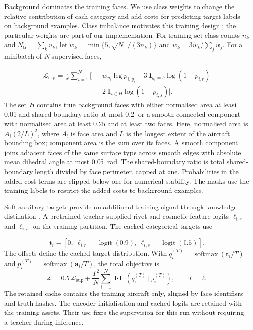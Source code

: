 \documentclass[12pt,a4paper]{article}
\begin{document}
Background dominates the training faces. We use class weights to change the relative contribution of each category and add costs for predicting target labels on background examples. Class imbalance motivates this training design \parencite{buda2018imbalance}; the particular weights are part of our implementation. For training-set class counts $n_k$ and $N_{\mathrm{tr}}=\sum_k n_k$, let $\tilde{w}_k=\min\{5,\sqrt{N_{\mathrm{tr}}/(3n_k)}\}$ and $w_k=3\tilde{w}_k/\sum_j\tilde{w}_j$. For a minibatch of $N$ supervised faces,

\begin{equation}
\begin{aligned}
\mathcal{L}_{\mathrm{sup}}=\frac{1}{N}\sum_{i=1}^{N}\big[&-w_{y_i}\log p_{i,y_i}
-3\,\mathbf{1}_{y_i=b}\log(1-p_{i,r})\\
&-2\,\mathbf{1}_{i\in H}\log(1-p_{i,s})\big].
\end{aligned}
\label{eq:categorical_supervision}
\end{equation}
The set $H$ contains true background faces with either normalised area at least 0.01 and shared-boundary ratio at most 0.2, or a smooth connected component with normalised area at least 0.25 and at least two faces. Here, normalised area is $A_i(2/L)^2$, where $A_i$ is face area and $L$ is the longest extent of the aircraft bounding box; component area is the sum over its faces. A smooth component joins adjacent faces of the same surface type across smooth edges with absolute mean dihedral angle at most 0.05~rad. The shared-boundary ratio is total shared-boundary length divided by face perimeter, capped at one. Probabilities in the added cost terms are clipped below one for numerical stability. The masks use the training labels to restrict the added costs to background examples.

Soft auxiliary targets provide an additional training signal through knowledge distillation \parencite{hinton2015distilling}. A pretrained teacher supplied rivet and cosmetic-feature logits $\ell_{i,r}$ and $\ell_{i,s}$ on the training partition. The cached categorical targets use

\begin{equation}
\mathbf{t}_i=\left[0,\ \ell_{i,r}-\operatorname{logit}(0.9),\
\ell_{i,s}-\operatorname{logit}(0.5)\right].
\label{eq:teacher_targets}
\end{equation}
The offsets define the cached target distribution. With $q_i^{(T)}=\operatorname{softmax}(\mathbf{t}_i/T)$ and $p_i^{(T)}=\operatorname{softmax}(\mathbf{a}_i/T)$, the total objective is
\begin{equation}
\mathcal{L}=0.5\,\mathcal{L}_{\mathrm{sup}}+
\frac{T^2}{N}\sum_{i=1}^{N}\operatorname{KL}\!\left(q_i^{(T)}\,\Vert\,p_i^{(T)}\right),
\qquad T=2.
\label{eq:distilled_categorical_objective}
\end{equation}
The retained cache contains the training aircraft only, aligned by face identifiers and truth hashes. The encoder initialisation and cached logits are retained with the training assets. Their use fixes the supervision for this run without requiring a teacher during inference.
\end{document}
